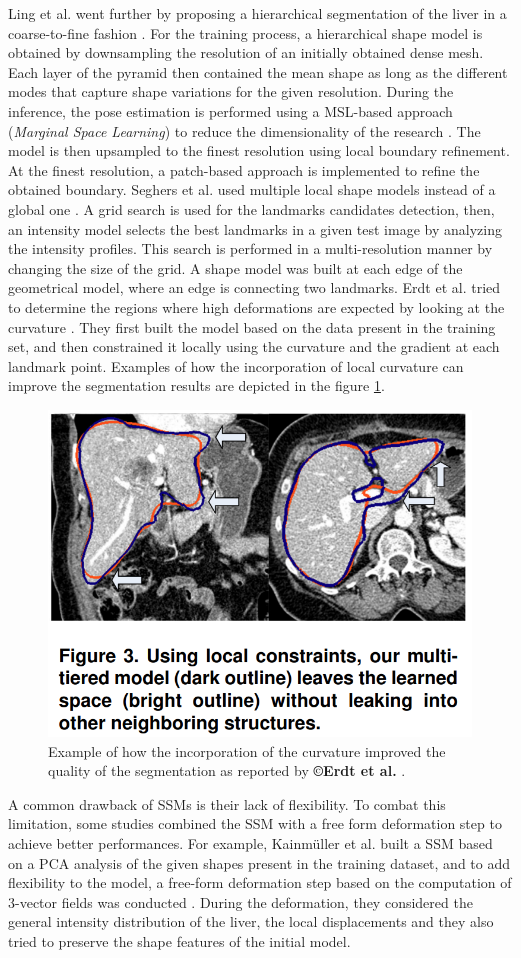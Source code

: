 \documentclass[]{article}
\begin{document}
	
	Ling et al. went further by proposing a hierarchical segmentation of
	the liver in a coarse-to-fine fashion \cite{Ling2008}. For the training process, a
	hierarchical shape model is obtained by downsampling the resolution of
	an initially obtained dense mesh. Each layer of the pyramid then
	contained the mean shape as long as the different modes that capture
	shape variations for the given resolution. During the inference, the
	pose estimation is performed using a MSL-based  approach (\emph{Marginal Space Learning}) to reduce the
	dimensionality of the research \cite{Zheng2007}. The model is then upsampled to the
	finest resolution using local boundary refinement. At the finest
	resolution, a patch-based approach is implemented to refine the obtained
	boundary.
	Seghers et al. used multiple local shape models instead of a global one \cite{Seghers2007}.
	A grid search is used for the landmarks candidates detection, then, an
	intensity model selects the best landmarks in a given test image by
	analyzing the intensity profiles. This search is performed in a
	multi-resolution manner by changing the size of the grid. A shape model
	was built at each edge of the geometrical model, where an edge is
	connecting two landmarks.
	Erdt et al. tried to determine the regions where high deformations
	are expected by looking at the curvature \cite{Erdt2010}. They first built the model
	based on the data present in the training set, and then constrained it
	locally using the curvature and the gradient at each landmark point.
	Examples of how the incorporation of local curvature can improve the
	segmentation results are depicted in the figure \ref{Erdt2010_Fig3}.
	
	\begin{figure}[th!]
		\centering
		\includegraphics[width=0.4\linewidth]{images/image33}
		\caption{Example of how the incorporation of the curvature improved the quality of the segmentation as reported by \textbf{©Erdt et al.} \cite{Erdt2010}.}
		\label{Erdt2010_Fig3}
	\end{figure}
	
	
	A common drawback of SSMs is their lack of flexibility. To combat this
	limitation, some studies combined the SSM with a free form deformation
	step to achieve better performances. For example, Kainmüller et al. built a SSM based on a PCA analysis of the given shapes
	present in the training dataset, and to add flexibility to the model, a
	free-form deformation step based on the computation of 3-vector fields
	was conducted \cite{Kainmueller2007}. During the deformation, they considered the general
	intensity distribution of the liver, the local displacements and they
	also tried to preserve the shape features of the initial model.
	
\end{document}
